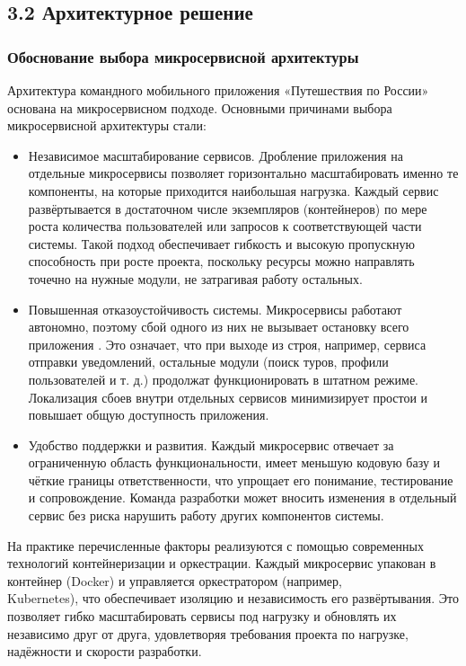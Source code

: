 \subsection*{3.2 Архитектурное решение}

\subsubsection*{Обоснование выбора микросервисной архитектуры}
Архитектура командного мобильного приложения «Путешествия по России» основана на микросервисном подходе. Основными причинами выбора микросервисной архитектуры стали:
\begin{itemize}
    \item Независимое масштабирование сервисов. Дробление приложения на отдельные микросервисы позволяет горизонтально масштабировать именно те компоненты, на которые приходится наибольшая нагрузка. Каждый сервис развёртывается в достаточном числе экземпляров (контейнеров) по мере роста количества пользователей или запросов к соответствующей части системы. Такой подход обеспечивает гибкость и высокую пропускную способность при росте проекта, поскольку ресурсы можно направлять точечно на нужные модули, не затрагивая работу остальных.
    \item Повышенная отказоустойчивость системы. Микросервисы работают автономно, поэтому сбой одного из них не вызывает остановку всего приложения \cite{6}. Это означает, что при выходе из строя, например, сервиса отправки уведомлений, остальные модули (поиск туров, профили пользователей и т. д.) продолжат функционировать в штатном режиме. Локализация сбоев внутри отдельных сервисов минимизирует простои и повышает общую доступность приложения.
    \item Удобство поддержки и развития. Каждый микросервис отвечает за ограниченную область функциональности, имеет меньшую кодовую базу и чёткие границы ответственности, что упрощает его понимание, тестирование и сопровождение. Команда разработки может вносить изменения в отдельный сервис без риска нарушить работу других компонентов системы.
\end{itemize}
На практике перечисленные факторы реализуются с помощью современных технологий контейнеризации и оркестрации. Каждый микросервис упакован в контейнер (Docker) и управляется оркестратором (например, \\ Kubernetes), что обеспечивает изоляцию и независимость его развёртывания. Это позволяет гибко масштабировать сервисы под нагрузку и обновлять их независимо друг от друга, удовлетворяя требования проекта по нагрузке, надёжности и скорости разработки.

